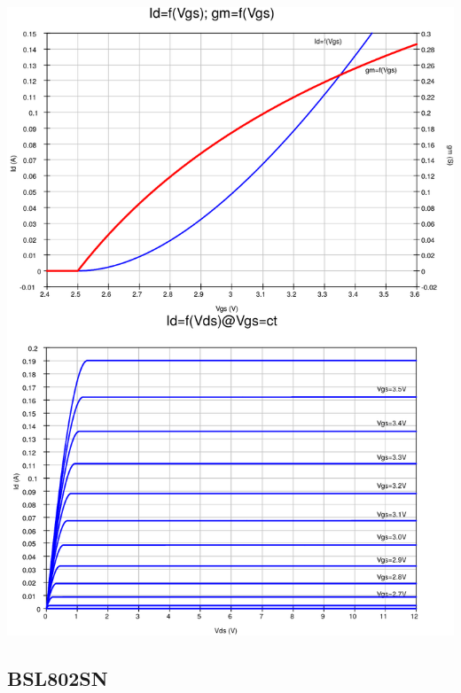 \documentclass{../../template/tp}
\begin{document}
\begin{center}
{\includegraphics[width=16cm]{courbes_mos_2k16-crop.pdf}\vspace*{-5cm}}%
\end{center}
%
\subsection{BSL802SN}
\end{document}
